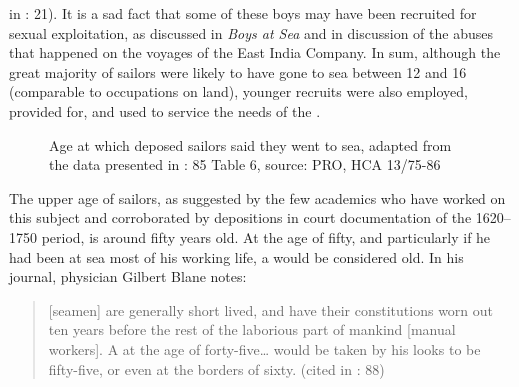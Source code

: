 in \citealt{AdkinsAdkins2008}: 21). It is a sad fact that some of these boys may have been recruited for sexual exploitation, as discussed in  \textit{Boys at Sea} and in  discussion of the abuses that happened on the voyages of the East India Company. In sum, although the great majority of sailors were likely to have gone to sea between 12 and 16 (comparable to occupations on land), younger recruits were also employed, provided for, and used to service the needs of the .


\begin{figure}
\caption{\label{fig:key:3.1}Age at which deposed sailors said they went to sea, adapted from the data presented in \citealt{Earle1998}: 85 Table 6, source: PRO, HCA 13/75-86}
\end{figure}

The upper age of sailors, as suggested by the few academics who have worked on this subject and corroborated by depositions in court documentation of the 1620–1750 period, is around fifty years old. At the age of fifty, and particularly if he had been at sea most of his working life, a  would be considered old.  In his journal, physician Gilbert Blane notes:

\begin{quotation}
[seamen] are generally short lived, and have their constitutions worn out ten years before the rest of the laborious part of mankind [manual workers]. A  at the age of forty-five… would be taken by his looks to be fifty-five, or even at the borders of sixty. (cited in \citealt{AdkinsAdkins2008}: 88) \end{quotation}

